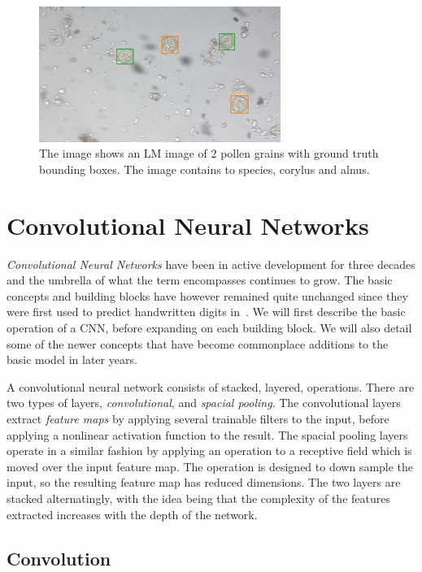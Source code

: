 \begin{figure}[htb]
  \centering
  \includegraphics[width=0.7\textwidth]{figs/background/GT-Snap-080.png}
  \caption[Bounding boxes]{The image shows an LM image of 2 pollen grains with ground truth bounding boxes.
The image contains to species, \textcolor{corylus}{corylus} and \textcolor{alnus}{alnus}.}\label{fig:bbox}
\end{figure}

\section{Convolutional Neural Networks}
\emph{Convolutional Neural Networks} have been in active development for three decades and the umbrella of what the term encompasses continues to grow.
The basic concepts and building blocks have however remained quite unchanged since they were first used to predict handwritten digits in~\cite{1989Hdrw}.
We will first describe the basic operation of a CNN, before expanding on each building block.
We will also detail some of the newer concepts that have become commonplace additions to the basic model in later years.

A convolutional neural network consists of stacked, layered, operations.
There are two types of layers, \textit{convolutional}, and \textit{spacial pooling}.
The convolutional layers extract \textit{feature maps} by applying several trainable filters to the input, before applying a nonlinear activation function to the result.
The spacial pooling layers operate in a similar fashion by applying an operation to a receptive field which is moved over the input feature map.
The operation is designed to down sample the input, so the resulting feature map has reduced dimensions.
The two layers are stacked alternatingly, with the idea being that the complexity of the features extracted increases with the depth of the network.

\subsection{Convolution}

